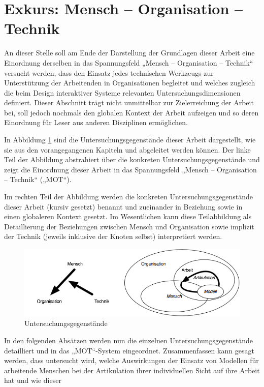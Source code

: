 \newpage

\section{Exkurs: Mensch -- Organisation -- Technik} %
\label{sec:untersuchungsgegenstände}

An dieser Stelle soll am Ende der Darstellung der Grundlagen dieser Arbeit eine Einordnung derselben in das Spannungsfeld „Mensch -- Organisation -- Technik“ \cite{Ulich97} versucht werden, dass den Einsatz jedes technischen Werkzeugs zur Unterstützung der Arbeitenden in Organisationen begleitet und welches zugleich die beim Design interaktiver Systeme relevanten Untersuchungsdimensionen definiert. Dieser Abschnitt trägt nicht unmittelbar zur Zielerreichung der Arbeit bei, soll jedoch nochmals den globalen Kontext der Arbeit aufzeigen und so deren Einordnung für Leser aus anderen Disziplinen ermöglichen.

In Abbildung \ref{fig:img_untersuchungsgegenstand} sind die Untersuchungsgegenstände dieser Arbeit dargestellt, wie sie aus den vorangegangenen Kapiteln und abgeleitet werden können. Der linke Teil der Abbildung abstrahiert über die konkreten Untersuchungsgegenstände und zeigt die Einordnung dieser Arbeit in das Spannungsfeld „Mensch -- Organisation -- Technik“ („MOT“).

Im rechten Teil der Abbildung werden die konkreten Untersuchungsgegenstände dieser Arbeit (kursiv gesetzt) benannt und zueinander in Beziehung sowie in einen globaleren Kontext gesetzt. Im Wesentlichen kann diese Teilabbildung als Detaillierung der Beziehungen zwischen Mensch und Organisation sowie implizit der Technik (jeweils inklusive der Knoten selbst) interpretiert werden.

\begin{figure}[htbp]
	\centering
		\includegraphics[width=15cm]{img/ExkursMOT/untersuchungsgegenstand.png}
	\caption{Untersuchungsgegenstände}
	\label{fig:img_untersuchungsgegenstand}
\end{figure}

In den folgenden Absätzen werden nun die einzelnen Untersuchungsgegenstände detailliert und in das „MOT“-System eingeordnet. Zusammenfassen kann gesagt werden, dass untersucht wird, welche Auswirkungen der Einsatz von Modellen für arbeitende Menschen bei der Artikulation ihrer individuellen Sicht auf ihre Arbeit hat und wie dieser 

